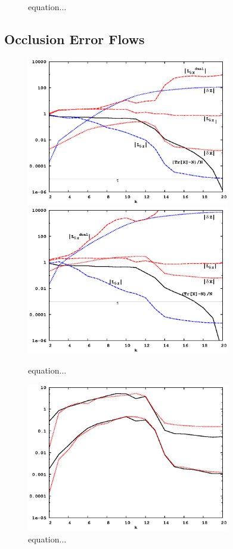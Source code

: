 \documentclass[letterpaper,twocolumn,amsmath,amsfont,amssymb,english,aps,jcp,preprintnumbers,groupaddress,nofootinbib,tightenlines]{revtex4}
\begin{document}
\begin{figure}[h]
  \caption{equation...}
\end{figure}




\subsection{Occlusion Error Flows}
\begin{figure}[h]
  \caption{equation...}
 \includegraphics[width=3.5in]{8x_33_nanotube_cond10_tau-5.eps}
 \includegraphics[width=3.5in]{8x_33_nanotube_cond10_tau-3.eps}
\end{figure}
\begin{figure}[h]
  \caption{equation...}
 \includegraphics[width=3.5in]{8x_33_nanotube_cond10_compare_errors.eps}
\end{figure}
\end{document}
